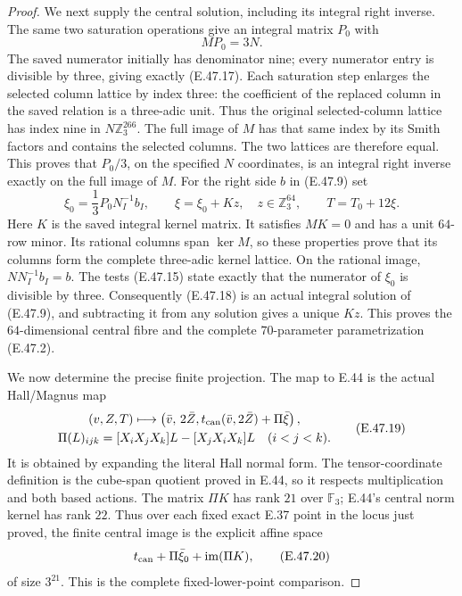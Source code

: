 \begin{proof}
We next supply the central solution, including
its integral right inverse.  The same two
saturation operations give an integral matrix
$P_0$ with
\[
                        M P_0=3N.
 \tag{E.47.17}
\]
The saved numerator initially has denominator
nine; every numerator entry is divisible by
three, giving exactly \textup{(E.47.17)}.
Each saturation step enlarges the selected
column lattice by index three: the coefficient
of the replaced column in the saved relation
is a three-adic unit.  Thus the original
selected-column lattice has index nine in
$N\mathbb Z_3^{266}$.  The full image of $M$
has that same index by its Smith factors and
contains the selected columns.  The two
lattices are therefore equal.  This proves
that $P_0/3$, on the specified $N$ coordinates,
is an integral right inverse exactly on the
full image of $M$.
For the right side $b$ in \textup{(E.47.9)} set
\[
 \xi_0=\frac13P_0N_I^{-1}b_I,\qquad
 \xi=\xi_0+Kz,\quad z\in\mathbb Z_3^{64},
 \qquad T=T_0+12\xi.
 \tag{E.47.18}
\]
Here $K$ is the saved integral kernel matrix.
It satisfies $MK=0$ and has a unit $64$-row
minor.  Its rational columns span $\ker M$, so
these properties prove that its columns form
the complete three-adic kernel lattice.
On the rational image, $NN_I^{-1}b_I=b$.
The tests \textup{(E.47.15)} state exactly that
the numerator of $\xi_0$ is divisible by three.
Consequently \textup{(E.47.18)} is an actual
integral solution of \textup{(E.47.9)}, and
subtracting it from any solution gives a unique
$Kz$.  This proves the $64$-dimensional central
fibre and the complete $70$-parameter
parametrization \textup{(E.47.2)}.

We now determine the precise finite projection.
The map to E.44 is the actual Hall/Magnus map
\[
 \begin{gathered}
 (v,Z,T)\longmapsto
 \left(\bar v,\,2\bar Z,
       t_{\rm can}(\bar v,2\bar Z)+\Pi\bar\xi\right),
 \\
 \Pi(L)_{ijk}=[X_iX_jX_k]L-[X_jX_iX_k]L
                  \quad(i<j<k).
 \end{gathered}
 \tag{E.47.19}
\]
It is obtained by expanding the literal Hall
normal form.  The tensor-coordinate definition
is the cube-span quotient proved in E.44, so
it respects multiplication and both based
actions.  The matrix $\Pi K$ has rank $21$
over $\mathbb F_3$; E.44's central norm kernel
has rank $22$.  Thus over each fixed exact
E.37 point in the locus just proved, the
finite central image is the explicit affine
space
\[
      t_{\rm can}+\Pi\bar\xi_0+\operatorname{im}(\Pi K),
 \tag{E.47.20}
\]
of size $3^{21}$.  This is the complete
fixed-lower-point comparison.


\end{proof}
